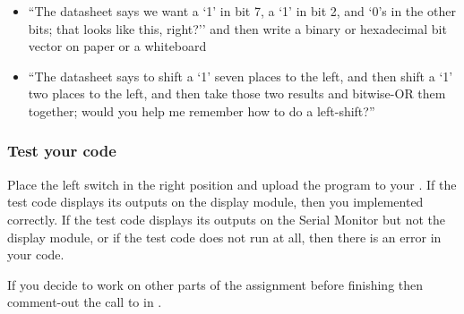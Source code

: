{\begin{itemize}
\begin{itemize}
\begin{itemize}
                        \item ``The datasheet says we want a `1' in bit 7, a `1' in bit 2, and `0's in the other bits; that looks like this, right?'' and then write a binary or hexadecimal bit vector on paper or a whiteboard
                        \item ``The datasheet says to shift a `1' seven places to the left, and then shift a `1' two places to the left, and then take those two results and bitwise-OR them together; would you help me remember how to do a left-shift?''
                    \end{itemize}
            \end{itemize}
    \end{itemize}
}{}

\subsubsection*{Test your code}

Place the left switch in the right position and upload the program to your \developmentboard.
If the test code displays its outputs on the display module, then you implemented  correctly.
If the test code displays its outputs on the Serial Monitor but not the display module, or if the test code does not run at all, then there is an error in your code.

\vspace{1cm}

If you decide to work on other parts of the assignment before finishing  then comment-out the call to  in .